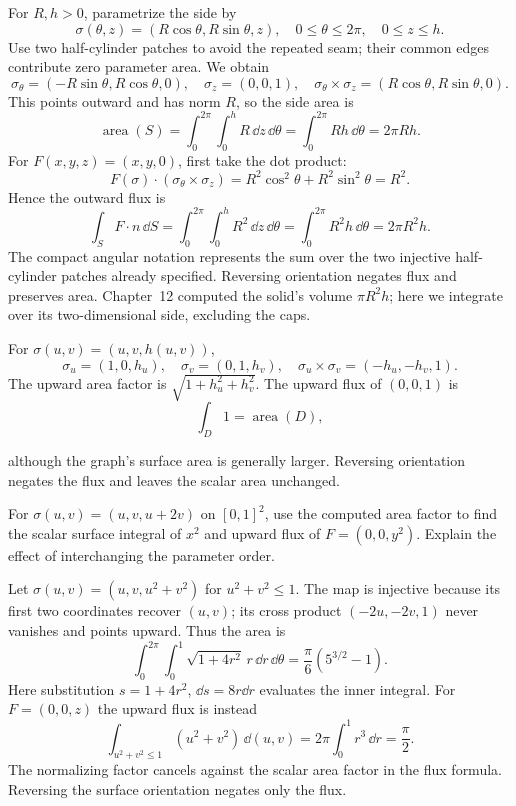 \begin{example}
For $R,h>0$, parametrize the side by
\[
\sigma(\theta,z)=(R\cos\theta,R\sin\theta,z),\quad
0\leq\theta\leq2\pi,\quad0\leq z\leq h.
\]
Use two half-cylinder patches to avoid the repeated seam; their common
edges contribute zero parameter area. We obtain
\[
\sigma_\theta=(-R\sin\theta,R\cos\theta,0),\quad \sigma_z=(0,0,1),
\quad\sigma_\theta\times\sigma_z=(R\cos\theta,R\sin\theta,0).
\]
This points outward and has norm $R$, so the side area is
\[
\operatorname{area}(S)=\int_0^{2\pi}\int_0^h R\,\dd z\,\dd\theta
=\int_0^{2\pi}Rh\,\dd\theta=2\pi Rh.
\]
For $F(x,y,z)=(x,y,0)$, first take the dot product:
\[
F(\sigma)\cdot(\sigma_\theta\times\sigma_z)
=R^2\cos^2\theta+R^2\sin^2\theta=R^2.
\]
Hence the outward flux is
\[
\int_S F\cdot n\,\dd S=\int_0^{2\pi}\int_0^h R^2\,\dd z\,\dd\theta
=\int_0^{2\pi}R^2h\,\dd\theta=2\pi R^2h.
\]
The compact angular notation represents the sum over the two injective
half-cylinder patches already specified. Reversing orientation negates
flux and preserves area. Chapter~12 computed the solid's volume $\pi R^2h$;
here we integrate over its two-dimensional side, excluding the caps.
\end{example}

\begin{example}
For $\sigma(u,v)=(u,v,h(u,v))$,
\[
\sigma_u=(1,0,h_u),\quad\sigma_v=(0,1,h_v),\quad
\sigma_u\times\sigma_v=(-h_u,-h_v,1).
\]
The upward area factor is $\sqrt{1+h_u^2+h_v^2}$.
The upward flux of $(0,0,1)$ is
\[
\int_D1=\operatorname{area}(D),
\]

although the graph's surface area is generally larger. Reversing orientation
negates the flux and leaves the scalar area unchanged.
\end{example}

\begin{exercise}
For $\sigma(u,v)=(u,v,u+2v)$ on $[0,1]^2$, use the computed area factor to find the scalar surface integral of $x^2$ and upward
flux of $F=(0,0,y^2)$. Explain the effect of interchanging the parameter order.
\end{exercise}

\begin{example}
Let $\sigma(u,v)=(u,v,u^2+v^2)$ for $u^2+v^2\leq1$.
The map is injective because its first two coordinates recover $(u,v)$;
its cross product $(-2u,-2v,1)$ never vanishes and points upward.
Thus the area is
\[
\int_0^{2\pi}\int_0^1\sqrt{1+4r^2}\,r\,\dd r\,\dd\theta
=\frac{\pi}{6}(5^{3/2}-1).
\]
Here substitution $s=1+4r^2$, $\dd s=8r\dd r$ evaluates the inner
integral. For $F=(0,0,z)$ the upward flux is instead
\[
\int_{u^2+v^2\leq1}(u^2+v^2)\,\dd(u,v)
=2\pi\int_0^1r^3\,\dd r=\frac\pi2.
\]
The normalizing factor cancels against the scalar area factor in the
flux formula. Reversing the surface orientation negates only the flux.
\end{example}
